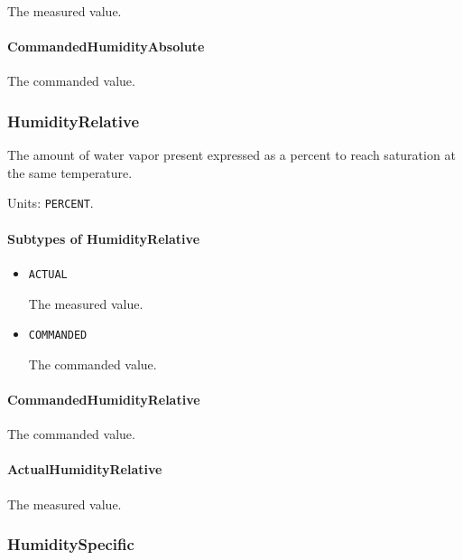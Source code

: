 The measured value.


\paragraph{CommandedHumidityAbsolute}\mbox{}
\label{sec:CommandedHumidityAbsolute}


The commanded value.


\subsubsection{HumidityRelative}
\label{sec:HumidityRelative}



The amount of water vapor present expressed as a percent to reach saturation at the same temperature.


Units: \texttt{PERCENT}.

\paragraph{Subtypes of HumidityRelative}\mbox{}
\label{sec:Subtypes of HumidityRelative}

\begin{itemize}

\item \texttt{ACTUAL}


The measured value.

\item \texttt{COMMANDED}


The commanded value.


\end{itemize}

\paragraph{CommandedHumidityRelative}\mbox{}
\label{sec:CommandedHumidityRelative}


The commanded value.


\paragraph{ActualHumidityRelative}\mbox{}
\label{sec:ActualHumidityRelative}


The measured value.


\subsubsection{HumiditySpecific}
\label{sec:HumiditySpecific}



